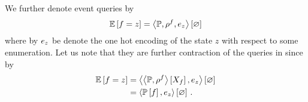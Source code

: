 We further denote event queries by
	\[  \mathbb{E}\left[f=z\right] = \left\langle \mathbb{P},\rho^{f},e_{z}\right\rangle \left[ \varnothing \right]\]
where by $e_{z}$ be denote the one hot encoding of the state $z$ with respect to some enumeration.
Let us note that they are further contraction of the queries in  since by 
\begin{align*}
	 \mathbb{E}\left[f=z\right] 
	& =  \left\langle  \left\langle \mathbb{P},\rho^{f}\right\rangle \left[ X_{f} \right] ,e_{z}\right\rangle \left[ \varnothing \right]\\
	& =  \left\langle  \mathbb{P}\left[f\right] ,e_{z}\right\rangle \left[ \varnothing \right] \, . 
\end{align*}


%
%
%






